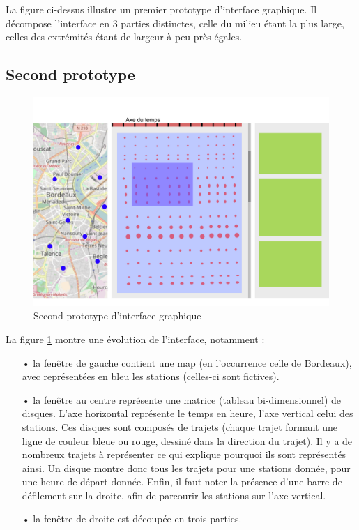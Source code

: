 \documentclass[12pt]{article}
\begin{document}
		La figure ci-dessus illustre un premier prototype d’interface graphique. Il décompose l’interface en 3 parties distinctes, celle du milieu étant la plus large, celles des extrémités étant de largeur à peu près égales.
		
		\subsection{Second prototype}
		\begin{figure}[!h]
		\begin{center}
		\includegraphics[scale=.5]{dia_proto-interface_2.png}
		\caption{Second prototype d’interface graphique}
		\label{fig:proto_int_2}
		\end{center}
		\end{figure}
		
		La figure \ref{fig:proto_int_2} montre une évolution de l’interface, notamment :\\
		\begin{itemize}
		\item[•] la fenêtre de gauche contient une map (en l'occurrence celle de Bordeaux), avec représentées en bleu les stations (celles-ci sont fictives).
		\item[•] la fenêtre au centre représente une matrice (tableau bi-dimensionnel) de disques. L’axe horizontal représente le temps en heure, l’axe vertical celui des stations. Ces disques sont composés de trajets (chaque trajet formant une ligne de couleur bleue ou rouge, dessiné dans la direction du trajet). Il y a de nombreux trajets à représenter ce qui explique pourquoi ils sont représentés ainsi. Un disque montre donc tous les trajets pour une stations donnée, pour une heure de départ donnée. Enfin, il faut noter la présence d’une barre de défilement sur la droite, afin de parcourir les stations sur l’axe vertical.
		\item[•] la fenêtre de droite est découpée en trois parties.
		\end{itemize}
		
\end{document}
